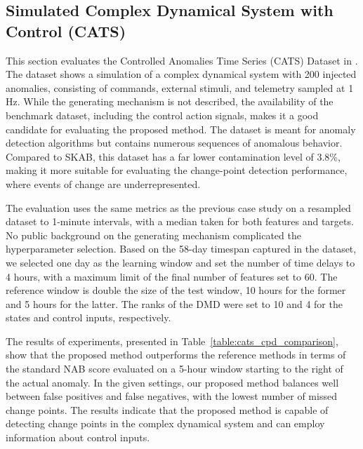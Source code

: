 \subsection{Simulated Complex Dynamical System with Control (CATS)}
This section evaluates the Controlled Anomalies Time Series (CATS) Dataset in \citet{Schmidl2022}. The dataset shows a simulation of a complex dynamical system with 200 injected anomalies, consisting of commands, external stimuli, and telemetry sampled at 1 Hz. While the generating mechanism is not described, the availability of the benchmark dataset, including the control action signals, makes it a good candidate for evaluating the proposed method. The dataset is meant for anomaly detection algorithms but contains numerous sequences of anomalous behavior. Compared to SKAB, this dataset has a far lower contamination level of 3.8\%, making it more suitable for evaluating the change-point detection performance, where events of change are underrepresented.

The evaluation uses the same metrics as the previous case study on a resampled dataset to 1-minute intervals, with a median taken for both features and targets. No public background on the generating mechanism complicated the hyperparameter selection. Based on the 58-day timespan captured in the dataset, we selected one day as the learning window and set the number of time delays to 4 hours, with a maximum limit of the final number of features set to 60. The reference window is double the size of the test window, 10 hours for the former and 5 hours for the latter. The ranks of the DMD were set to 10 and 4 for the states and control inputs, respectively.

The results of experiments, presented in Table~\ref{table:cats_cpd_comparison}, show that the proposed method outperforms the reference methods in terms of the standard NAB score evaluated on a 5-hour window starting to the right of the actual anomaly. In the given settings, our proposed method balances well between false positives and false negatives, with the lowest number of missed change points. The results indicate that the proposed method is capable of detecting change points in the complex dynamical system and can employ information about control inputs.

